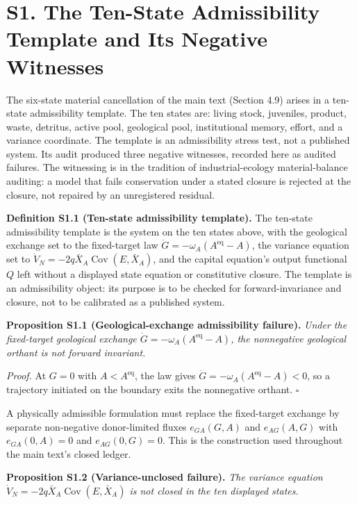 \documentclass[11pt]{article}
\begin{document}
\vspace{0.8em}

\section*{S1. The Ten-State Admissibility Template and Its Negative Witnesses}\label{s1-the-ten-state-admissibility-template-and-its-negative-witnesses}

The six-state material cancellation of the main text (Section 4.9) arises in a ten-state admissibility template. The ten states are: living stock, juveniles, product, waste, detritus, active pool, geological pool, institutional memory, effort, and a variance coordinate. The template is an admissibility stress test, not a published system. Its audit produced three negative witnesses, recorded here as audited failures. The witnessing is in the tradition of industrial-ecology material-balance auditing: a model that fails conservation under a stated closure is rejected at the closure, not repaired by an unregistered residual.

\textbf{Definition S1.1 (Ten-state admissibility template).} The ten-state admissibility template is the system on the ten states above, with the geological exchange set to the fixed-target law \(\dot G = -\omega_A(A^{\mathrm{eq}} - A)\), the variance equation set to \(\dot V_N = -2q\bar X_A \operatorname{Cov}(E, \bar X_A)\), and the capital equation's output functional \(Q\) left without a displayed state equation or constitutive closure. The template is an admissibility object: its purpose is to be checked for forward-invariance and closure, not to be calibrated as a published system.

\textbf{Proposition S1.1 (Geological-exchange admissibility failure).} \emph{Under the fixed-target geological exchange \(\dot G = -\omega_A(A^{\mathrm{eq}} - A)\), the nonnegative geological orthant is not forward invariant.}

\emph{Proof.} At \(G = 0\) with \(A < A^{\mathrm{eq}}\), the law gives \(\dot G = -\omega_A(A^{\mathrm{eq}} - A) < 0\), so a trajectory initiated on the boundary exits the nonnegative orthant. \(\square\)

A physically admissible formulation must replace the fixed-target exchange by separate non-negative donor-limited fluxes \(e_{GA}(G, A)\) and \(e_{AG}(A, G)\) with \(e_{GA}(0, A) = 0\) and \(e_{AG}(0, G) = 0\). This is the construction used throughout the main text's closed ledger.

\textbf{Proposition S1.2 (Variance-unclosed failure).} \emph{The variance equation \(\dot V_N = -2q\bar X_A \operatorname{Cov}(E, \bar X_A)\) is not closed in the ten displayed states.}
\end{document}
